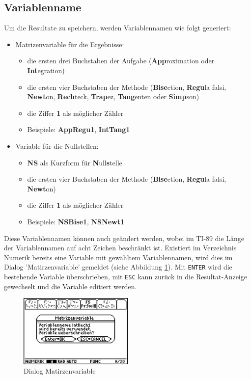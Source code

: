 \documentclass[a4paper,10pt]{scrreprt}
\begin{document}
\subsection{Variablenname}
Um die Resultate zu speichern, werden Variablennamen wie folgt generiert:
\begin{itemize}
    \item Matrizenvariable f\"ur die Ergebnisse:
    \begin{itemize}
      \item die ersten drei Buchstaben der Aufgabe (\textbf{App}roximation oder \textbf{Int}egration)
      \item die ersten vier Buchstaben der Methode (\textbf{Bise}ction, \textbf{Regu}la falsi, \textbf{Newt}on, \textbf{Rech}teck, \textbf{Trap}ez, \textbf{Tang}enten oder \textbf{Simp}son)
      \item die Ziffer \textbf{1} als m\"oglicher Z\"ahler
      \item Beispiele: \textbf{AppRegu1}, \textbf{IntTang1}
    \end{itemize}
    \item Variable f\"ur die Nullstellen:
    \begin{itemize}
      \item \textbf{NS} als Kurzform f\"ur \textbf{N}ull\textbf{s}telle
      \item die ersten vier Buchstaben der Methode (\textbf{Bise}ction, \textbf{Regu}la falsi, \textbf{Newt}on)
      \item die Ziffer \textbf{1} als m\"oglicher Z\"ahler
      \item Beispiele: \textbf{NSBise1}, \textbf{NSNewt1}
    \end{itemize}
\end{itemize}
Diese Variablennamen k\"onnen auch ge\"andert werden, wobei im TI-89 die L\"ange der Variablennamen auf acht Zeichen beschr\"ankt ist. Existiert im Verzeichnis Numerik bereits eine Variable mit gew\"ahltem Variablennamen, wird dies im Dialog 'Matirzenvariable' gemeldet (siehe Abbildung \ref{fig:Matirzenvariable}). Mit \verb|ENTER| wird die bestehende Variable \"uberschrieben, mit \verb|ESC| kann zur\"uck in die Resultat-Anzeige gewechselt und die Variable editiert werden.
\begin{figure}[h]
  \centering
  \includegraphics[width=0.5\textwidth]{img/nummeth_image032.png}
  \caption{Dialog Matirzenvariable}
  \label{fig:Matirzenvariable}
\end{figure}
\end{document}
